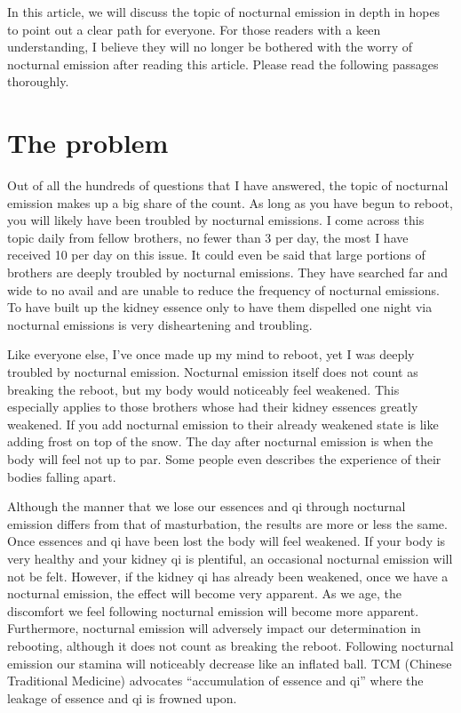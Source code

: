 \documentclass[
]{book}
\begin{document}
In this article, we will discuss the topic of nocturnal emission in depth in hopes to point out a clear path for everyone. For those readers with a keen understanding, I believe they will no longer be bothered with the worry of nocturnal emission after reading this article. Please read the following passages thoroughly.

\hypertarget{the-problem}{%
\section{The problem}\label{the-problem}}

Out of all the hundreds of questions that I have answered, the topic of nocturnal emission makes up a big share of the count. As long as you have begun to reboot, you will likely have been troubled by nocturnal emissions. I come across this topic daily from fellow brothers, no fewer than 3 per day, the most I have received 10 per day on this issue. It could even be said that large portions of brothers are deeply troubled by nocturnal emissions. They have searched far and wide to no avail and are unable to reduce the frequency of nocturnal emissions. To have built up the kidney essence only to have them dispelled one night via nocturnal emissions is very disheartening and troubling.

Like everyone else, I've once made up my mind to reboot, yet I was deeply troubled by nocturnal emission. Nocturnal emission itself does not count as breaking the reboot, but my body would noticeably feel weakened. This especially applies to those brothers whose had their kidney essences greatly weakened. If you add nocturnal emission to their already weakened state is like adding frost on top of the snow. The day after nocturnal emission is when the body will feel not up to par. Some people even describes the experience of their bodies falling apart.

Although the manner that we lose our essences and qi through nocturnal emission differs from that of masturbation, the results are more or less the same. Once essences and qi have been lost the body will feel weakened. If your body is very healthy and your kidney qi is plentiful, an occasional nocturnal emission will not be felt. However, if the kidney qi has already been weakened, once we have a nocturnal emission, the effect will become very apparent. As we age, the discomfort we feel following nocturnal emission will become more apparent. Furthermore, nocturnal emission will adversely impact our determination in rebooting, although it does not count as breaking the reboot. Following nocturnal emission our stamina will noticeably decrease like an inflated ball. TCM (Chinese Traditional Medicine) advocates ``accumulation of essence and qi'' where the leakage of essence and qi is frowned upon.
\end{document}
